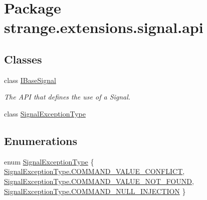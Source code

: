 \hypertarget{namespacestrange_1_1extensions_1_1signal_1_1api}{\section{Package strange.\-extensions.\-signal.\-api}
\label{namespacestrange_1_1extensions_1_1signal_1_1api}
}
\subsection*{Classes}
\begin{DoxyCompactItemize}
\item 
class \hyperlink{interfacestrange_1_1extensions_1_1signal_1_1api_1_1_i_base_signal}{I\-Base\-Signal}
\begin{DoxyCompactList}\small\item\em The A\-P\-I that defines the use of a Signal. \end{DoxyCompactList}\item 
class \hyperlink{classstrange_1_1extensions_1_1signal_1_1api_1_1_signal_exception_type}{Signal\-Exception\-Type}
\end{DoxyCompactItemize}
\subsection*{Enumerations}
\begin{DoxyCompactItemize}
\item 
enum \hyperlink{namespacestrange_1_1extensions_1_1signal_1_1api_a1303547618565f5ed4dea0f25f27975d}{Signal\-Exception\-Type} \{ \hyperlink{namespacestrange_1_1extensions_1_1signal_1_1api_a1303547618565f5ed4dea0f25f27975da18c5b6af1953195e1a4b42a86b77d476}{Signal\-Exception\-Type.\-C\-O\-M\-M\-A\-N\-D\-\_\-\-V\-A\-L\-U\-E\-\_\-\-C\-O\-N\-F\-L\-I\-C\-T}, 
\hyperlink{namespacestrange_1_1extensions_1_1signal_1_1api_a1303547618565f5ed4dea0f25f27975da78d4fc65e714d3c83feeec903511caaf}{Signal\-Exception\-Type.\-C\-O\-M\-M\-A\-N\-D\-\_\-\-V\-A\-L\-U\-E\-\_\-\-N\-O\-T\-\_\-\-F\-O\-U\-N\-D}, 
\hyperlink{namespacestrange_1_1extensions_1_1signal_1_1api_a1303547618565f5ed4dea0f25f27975da1dedd40aa296cd154568f394d88c5bd2}{Signal\-Exception\-Type.\-C\-O\-M\-M\-A\-N\-D\-\_\-\-N\-U\-L\-L\-\_\-\-I\-N\-J\-E\-C\-T\-I\-O\-N}
 \}
\end{DoxyCompactItemize}


